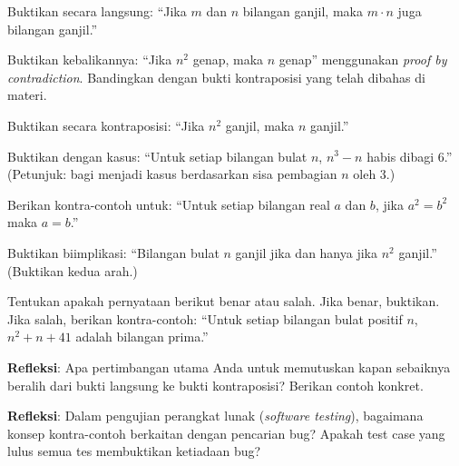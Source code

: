 \documentclass[../main]{subfiles}
\begin{document}

\begin{latihan}
  \item Buktikan secara langsung: ``Jika $m$ dan $n$ bilangan ganjil, maka $m \cdot n$ juga bilangan ganjil.''
  \item Buktikan kebalikannya: ``Jika $n^2$ genap, maka $n$ genap'' menggunakan \textit{proof by contradiction}. Bandingkan dengan bukti kontraposisi yang telah dibahas di materi.
  \item Buktikan secara kontraposisi: ``Jika $n^2$ ganjil, maka $n$ ganjil.''
  \item Buktikan dengan kasus: ``Untuk setiap bilangan bulat $n$, $n^3 - n$ habis dibagi 6.'' (Petunjuk: bagi menjadi kasus berdasarkan sisa pembagian $n$ oleh 3.)
  \item Berikan kontra-contoh untuk: ``Untuk setiap bilangan real $a$ dan $b$, jika $a^2 = b^2$ maka $a = b$.''
  \item Buktikan biimplikasi: ``Bilangan bulat $n$ ganjil jika dan hanya jika $n^2$ ganjil.'' (Buktikan kedua arah.)
  \item Tentukan apakah pernyataan berikut benar atau salah. Jika benar, buktikan. Jika salah, berikan kontra-contoh: ``Untuk setiap bilangan bulat positif $n$, $n^2 + n + 41$ adalah bilangan prima.''
  \item \textbf{Refleksi}: Apa pertimbangan utama Anda untuk memutuskan kapan sebaiknya beralih dari bukti langsung ke bukti kontraposisi? Berikan contoh konkret.
  \item \textbf{Refleksi}: Dalam pengujian perangkat lunak (\textit{software testing}), bagaimana konsep kontra-contoh berkaitan dengan pencarian bug? Apakah test case yang lulus semua tes membuktikan ketiadaan bug?
\end{latihan}

\end{document}
